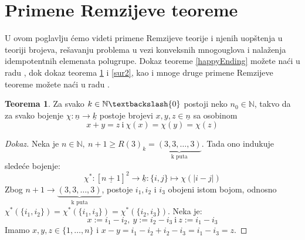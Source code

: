 \documentclass{article}
\theoremstyle{definition}
\newtheorem{teorema}{Teorema}[section]
\newcommand{\dokaz}[1]{\begin{proof}[Dokaz]#1\end{proof}}
\begin{document}
	\section{Primene Remzijeve teoreme} \label{primenePoglavlje}
	U ovom poglavlju ćemo videti primene Remzijeve teorije i njenih uopštenja u teoriji brojeva, rešavanju problema u vezi konveksnih mnogouglova i nalaženja idempotentnih elemenata polugrupe. Dokaz teoreme \ref{happyEnding} možete naći u radu \cite{happyEndingProof}, dok dokaz teorema \ref{sur} i \ref{sur2}, kao i mnoge druge primene Remzijeve teoreme možete naći u radu \cite{RamseyPrimene}.
	
	\begin{teorema}\label{sur}
		Za svako $k \in \mathbb{N}\textbackslash \{0\}$  postoji neko $n_{0} \in \mathbb{N}$, takvo da za svako bojenje $\chi:\underline{n} \rightarrow \underline{k}$ postoje brojevi $x, y, z \in \underline{n}$ sa osobinom 
		\[
		x + y = z \: \mathrm{i} \: \chi(x)= \chi(y)=\chi(z)
		\]
	\end{teorema}
	\dokaz{
		Neka je $n \in \mathbb{N},\: n+1 \geq R(3)_k=\underbrace{(3,3,\ldots,3)}_\text{k puta}$. Tada ono indukuje sledeće bojenje:
		\[
		\chi^*:[\underline{n+1}]^2\rightarrow \underline{k}:\{i,j\}\mapsto \chi(|i-j|)
		\]
		Zbog $n+1 \rightarrow \underbrace{(3,3,\ldots,3)}_\text{k puta}$, postoje $i_1, i_2$ i $i_3$ obojeni istom bojom, odnosno $\chi^*(\{i_1,i_2\})=\chi^*(\{i_1,i_3\})=\chi^*(\{i_2,i_3\})$. Neka je:
		\[
		x:=i_1-i_2,\:y:=i_2-i_3\:\mathrm{i}\:z:=i_1-i_3
		\]
		Imamo $x,y,z\in \{1,\ldots,n\}$ i $x-y=i_1-i_2+i_2-i_3=i_1-i_3=z$.
	}
	
\end{document}
